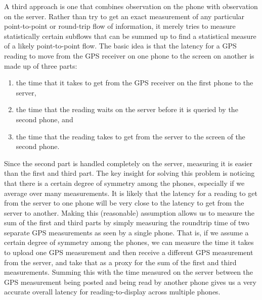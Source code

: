 \documentclass{acm_proc_article-sp}
\begin{document}
A third approach is one that combines observation on the phone with observation on the server.  Rather than try to get an exact measurement of any particular point-to-point or round-trip flow of information, it merely tries to measure statistically certain subflows that can be summed up to find a statistical measure of a likely point-to-point flow.  The basic idea is that the latency for a GPS reading to move from the GPS receiver on one phone to the screen on another is made up of three parts:
\begin{enumerate}
\item the time that it takes to get from the GPS receiver on the first phone to the server,
\item the time that the reading waits on the server before it is queried by the second phone, and
\item the time that the reading takes to get from the server to the screen of the second phone.
\end{enumerate}
Since the second part is handled completely on the server, measuring it is easier than the first and third part.  The key insight for solving this problem is noticing that there is a certain degree of symmetry among the phones, especially if we average over many measurements.  It is likely that the latency for a reading to get from the server to one phone will be very close to the latency to get from the server to another.  Making this (reasonable) assumption allows us to measure the sum of the first and third parts by simply measuring the roundtrip time of two separate GPS measurements as seen by a single phone.  That is, if we assume a certain degree of symmetry among the phones, we can measure the time it takes to upload one GPS measurement and then receive a different GPS measurement from the server, and take that as a proxy for the sum of the first and third measurements.  Summing this with the time measured on the server between the GPS measurement being posted and being read by another phone gives us a very accurate overall latency for reading-to-display across multiple phones.
\end{document}
